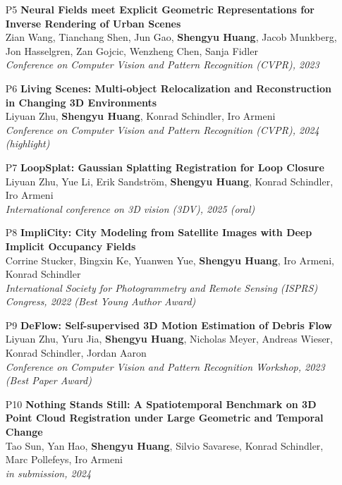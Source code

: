 \begin{itemize}   
    \item [P5] \noindent\textbf{ Neural Fields meet Explicit Geometric Representations for Inverse Rendering of Urban Scenes} \\[0.5em]
    Zian Wang, Tianchang Shen, Jun Gao, \textbf{Shengyu Huang}, Jacob Munkberg, Jon Hasselgren, Zan Gojcic, Wenzheng Chen, Sanja Fidler \\
    \textit{Conference on Computer Vision and Pattern Recognition (CVPR), 2023}
    
    \item [P6] \noindent\textbf{ Living Scenes: Multi-object Relocalization and Reconstruction in Changing 3D Environments} \\[0.5em]
    Liyuan Zhu, \textbf{Shengyu Huang}, Konrad Schindler, Iro Armeni \\
    \textit{Conference on Computer Vision and Pattern Recognition (CVPR), 2024 (highlight)}

    \item [P7] \noindent\textbf{ LoopSplat: Gaussian Splatting Registration for Loop Closure} \\[0.5em]
    Liyuan Zhu, Yue Li, Erik Sandström, \textbf{Shengyu Huang}, Konrad Schindler, Iro Armeni \\
    \textit{International conference on 3D vision (3DV), 2025 (oral)}

    \item [P8] \noindent\textbf{ ImpliCity: City Modeling from Satellite Images with Deep Implicit Occupancy Fields} \\[0.5em]
    Corrine Stucker, Bingxin Ke, Yuanwen Yue, \textbf{Shengyu Huang}, Iro Armeni, Konrad Schindler \\
    \textit{International Society for Photogrammetry and Remote Sensing (ISPRS) Congress, 2022 (Best Young Author Award)} 

    \item [P9] \noindent\textbf{ DeFlow: Self-supervised 3D Motion Estimation of Debris Flow} \\[0.5em]
    Liyuan Zhu, Yuru Jia, \textbf{Shengyu Huang}, Nicholas Meyer, Andreas Wieser, Konrad Schindler, Jordan Aaron \\
    \textit{Conference on Computer Vision and Pattern Recognition Workshop, 2023 (Best Paper Award)}

    \item [P10] \noindent\textbf{ Nothing Stands Still: A Spatiotemporal Benchmark on 3D Point Cloud Registration under Large Geometric and Temporal Change} \\[0.5em]
    Tao Sun, Yan Hao, \textbf{Shengyu Huang}, Silvio Savarese, Konrad Schindler, Marc Pollefeys, Iro Armeni \\
    \textit{in submission, 2024}


\end{itemize}
